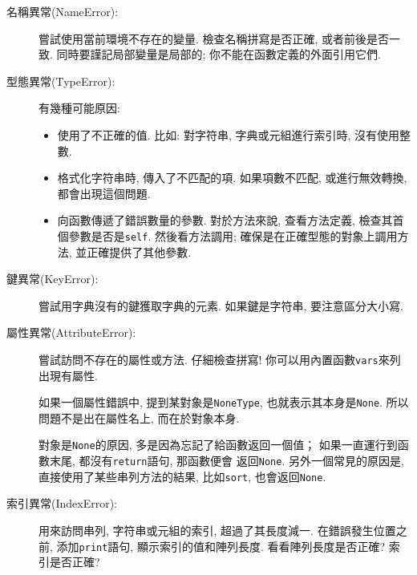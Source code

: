 \documentclass[10pt]{book}
\begin{document}
\begin{description}

\item[名稱異常(NameError):] 嘗試使用當前環境不存在的變量. 
檢查名稱拼寫是否正確, 或者前後是否一致. 
同時要謹記局部變量是局部的; 你不能在函數定義的外面引用它們.

\item[型態異常(TypeError):] 有幾種可能原因:

\begin{itemize}

\item  使用了不正確的值. 比如: 對字符串, 字典或元組進行索引時, 沒有使用整數. 

\item 格式化字符串時, 傳入了不匹配的項. 
如果項數不匹配, 或進行無效轉換, 都會出現這個問題. 

\item 向函數傳遞了錯誤數量的參數. 對於方法來說, 查看方法定義, 
檢查其首個參數是否是{\tt self}.
然後看方法調用; 確保是在正確型態的對象上調用方法, 
並正確提供了其他參數. 

\end{itemize}

\item[鍵異常(KeyError):]  嘗試用字典沒有的鍵獲取字典的元素. 
如果鍵是字符串, 要注意區分大小寫. 

\item[屬性異常(AttributeError):] 嘗試訪問不存在的屬性或方法. 
仔細檢查拼寫! 你可以用內置函數{\tt vars}來列出現有屬性. 

如果一個屬性錯誤中, 提到某對象是{\tt NoneType},
也就表示其本身是{\tt None}.
所以問題不是出在屬性名上, 而在於對象本身. 

對象是{\tt None}的原因, 多是因為忘記了給函數返回一個值；
如果一直運行到函數末尾, 都沒有{\tt return}語句, 那函數便會
返回{\tt None}. 
另外一個常見的原因是, 直接使用了某些串列方法的結果, 比如{\tt sort}, 
也會返回{\tt None}.

\item[索引異常(IndexError):] 用來訪問串列, 字符串或元組的索引, 超過了其長度減一. 
在錯誤發生位置之前, 添加{\tt print}語句, 顯示索引的值和陣列長度. 
看看陣列長度是否正確? 索引是否正確?

\end{description}
\end{document}
